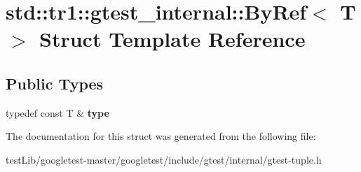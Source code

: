 \hypertarget{structstd_1_1tr1_1_1gtest__internal_1_1ByRef}{}\section{std\+:\+:tr1\+:\+:gtest\+\_\+internal\+:\+:By\+Ref$<$ T $>$ Struct Template Reference}
\label{structstd_1_1tr1_1_1gtest__internal_1_1ByRef}
\subsection*{Public Types}
\begin{DoxyCompactItemize}
\item 
\mbox{\label{structstd_1_1tr1_1_1gtest__internal_1_1ByRef_ac42ad942ee1cfa86b2abcce9b88ac10e}} 
typedef const T \& {\bfseries type}
\end{DoxyCompactItemize}


The documentation for this struct was generated from the following file\+:\begin{DoxyCompactItemize}
\item 
test\+Lib/googletest-\/master/googletest/include/gtest/internal/gtest-\/tuple.\+h\end{DoxyCompactItemize}
